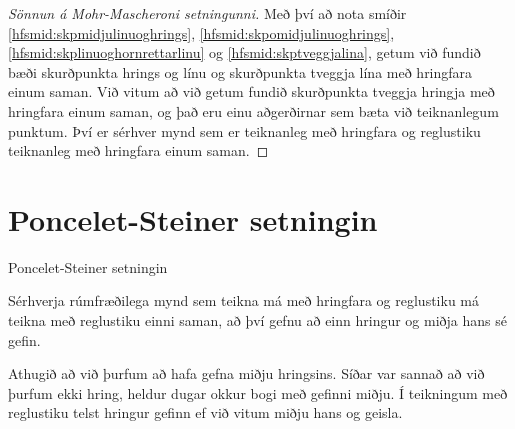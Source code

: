   \begin{frame}
  \begin{proof}[Sönnun á Mohr-Mascheroni setningunni]
    Með því að nota smíðir \ref{hfsmid:skpmidjulinuoghrings},
    \ref{hfsmid:skpomidjulinuoghrings},
    \ref{hfsmid:skplinuoghornrettarlinu} og \ref{hfsmid:skptveggjalina},
    getum við fundið bæði skurðpunkta hrings og
    línu og skurðpunkta tveggja lína með  hringfara einum
    saman. Við vitum að við getum fundið skurðpunkta tveggja hringja
    með hringfara einum saman, og það eru einu aðgerðirnar sem
    bæta við teiknanlegum punktum. Því er sérhver mynd sem
    er teiknanleg með hringfara og reglustiku
    teiknanleg með hringfara einum saman.
  \end{proof}
\end{frame}







\section{Poncelet-Steiner setningin}
\begin{frame}{Poncelet-Steiner setningin}
\begin{setn}
Sérhverja rúmfræðilega mynd sem teikna má með hringfara og reglustiku má teikna
með reglustiku einni saman, að því gefnu að einn hringur og miðja hans sé gefin.
\end{setn}

Athugið að við þurfum að hafa gefna miðju hringsins.
Síðar var sannað að við þurfum ekki hring, heldur dugar okkur bogi með gefinni miðju.
Í teikningum með reglustiku telst hringur gefinn ef við vitum miðju hans og
geisla.
\end{frame}

